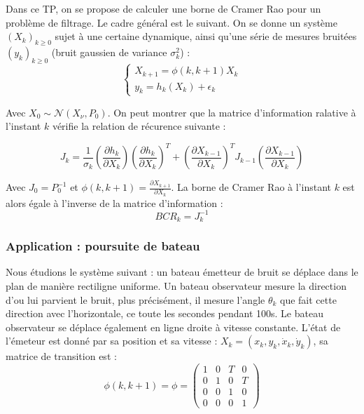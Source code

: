 \documentclass{article}
\begin{document}
Dans ce TP, on se propose de calculer une borne de Cramer Rao pour un problème de filtrage. Le cadre général est le suivant.
On se donne un système  $(X_{k})_{k\geq 0}$ sujet à une certaine dynamique,
ainsi qu'une série de mesures bruitées $(y_{k})_{k \geq 0}$ (bruit gaussien de variance $\sigma_{k}^{2}$) : 
\[\left\{\begin{array}{ll}
   X_{k+1} = \phi(k,k+1)X_{k} \\
   y_{k}=h_{k}(X_{k})+\epsilon_{k}
\end{array}\right. \]

Avec $X_{0} \sim  \mathcal{N} (X_{\nu},P_{0})$. On peut montrer que la matrice d'information ralative à l'instant $k$ vérifie
la relation de récurence suivante : 

\[ J_{k} = \frac{1}{\sigma_{k}}\left(\frac{\partial h_{k}}{\partial X_{k}}\right)\left(\frac{\partial h_{k}}{\partial X_{k}}\right)^{T}+\left(\frac{\partial X_{k-1}}{\partial X_{k}}\right)^{T}J_{k-1}\left(\frac{\partial X_{k-1}}{\partial X_{k}}\right)\]

Avec $J_{0}=P_{0}^{-1}$ et $\phi(k,k+1)=\frac{\partial X_{k+1}}{\partial X_{k}}$.
La borne de Cramer Rao à l'instant $k$ est alors égale à l'inverse de la matrice d'information : 
\[BCR_{k}= J_{k}^{-1}\]

\subsubsection{Application : poursuite de bateau}
Nous étudions le système suivant : un bateau émetteur de bruit se déplace dans le plan de manière rectiligne uniforme. 
Un bateau observateur mesure la direction d'ou lui parvient le bruit, plus précisément, il mesure l'angle $\theta_{k}$ que fait cette direction avec l'horizontale, ce toute les secondes pendant 100s. Le bateau observateur se déplace également en ligne droite à vitesse constante.
L'état de l'émeteur est donné par sa position et sa vitesse : $X_{k} = (x_{k},y_{k},\dot{x}_{k},\dot{y}_{k})$, sa matrice de transition est :
\[\phi(k,k+1) = \phi =  \begin{pmatrix}
  1 & 0 & T & 0 \\
  0 & 1 & 0 & T \\
  0 & 0 & 1 & 0 \\
  0 & 0 & 0 & 1 
  \end{pmatrix}\]
\end{document}
